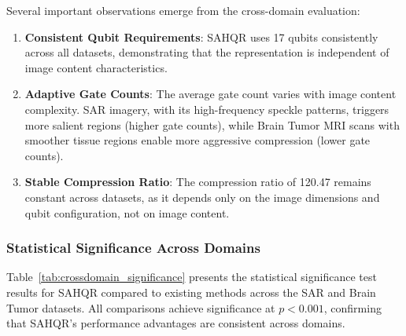 \documentclass{ipol}
\begin{document}
Several important observations emerge from the cross-domain evaluation:

\begin{enumerate}
\item \textbf{Consistent Qubit Requirements}: SAHQR uses 17 qubits consistently across all datasets, demonstrating that the representation is independent of image content characteristics.

\item \textbf{Adaptive Gate Counts}: The average gate count varies with image content complexity. SAR imagery, with its high-frequency speckle patterns, triggers more salient regions (higher gate counts), while Brain Tumor MRI scans with smoother tissue regions enable more aggressive compression (lower gate counts).

\item \textbf{Stable Compression Ratio}: The compression ratio of 120.47 remains constant across datasets, as it depends only on the image dimensions and qubit configuration, not on image content.
\end{enumerate}

\subsubsection{Statistical Significance Across Domains}

Table~\ref{tab:crossdomain_significance} presents the statistical significance test results for SAHQR compared to existing methods across the SAR and Brain Tumor datasets. All comparisons achieve significance at $p < 0.001$, confirming that SAHQR's performance advantages are consistent across domains.
\end{document}
